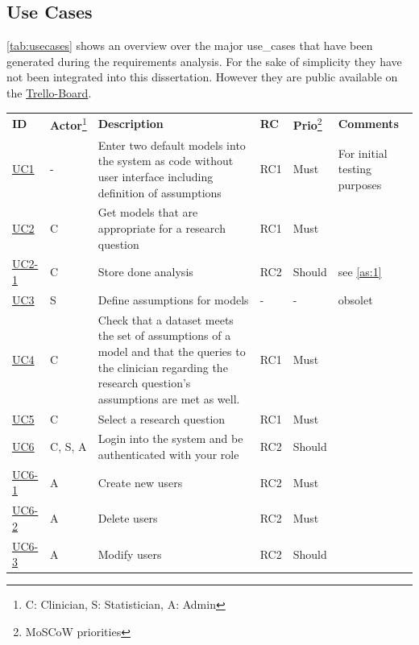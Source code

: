 \subsection{Use Cases}
\label{sub:use_cases}
\autoref{tab:usecases} shows an overview over the major \glspl{use_case} that have been generated during the requirements analysis. For the sake of simplicity they have not been integrated into this dissertation. However they are public available on the \href{https://trello.com/b/ywCkicpc}{Trello-Board}.

\begin{landscape}
	\begin{longtable}{ l l p{10.5cm} l l p{3cm} }
		\textbf{ID}                         & \textbf{\gls{Actor}}\footnote{C: Clinician, S: Statistician, A: Admin} &\textbf{Description} &  \textbf{RC} & \textbf{Prio}\footnote{MoSCoW priorities} &  \textbf{Comments}\\
		\href{https://trello.com/c/KEOokZp9}{UC1}   & 	- & 	Enter two default models into the system as code without user interface including definition of assumptions & RC1 & Must &  For initial testing purposes  \\
		\href{https://trello.com/c/ebVrFdA5}{UC2}   & 	C & 	Get models that are appropriate for a research question & RC1	& Must &	   \\
		\href{https://trello.com/c/ORRBjISQ}{UC2-1} & 	C & 	Store done analysis & RC2 & Should &  see \autoref{as:1} \\
		\href{https://trello.com/c/qKLAoWRj}{UC3} 	&  	S & 	Define assumptions for models & - & - & obsolet \\
		\href{https://trello.com/c/7NINsfz8}{UC4}   & 	C & 	Check that a dataset meets the set of assumptions of a model and that the queries to the clinician regarding the research question's  assumptions are met as well. & RC1 & Must   &   \\
		\href{https://trello.com/c/22JGne3r}{UC5}   & 	C & 	Select a research question & RC1 & Must &   \\
		\href{https://trello.com/c/CVGBVWID}{UC6}   &   C, S, A & 	Login into the system and be authenticated with your role & RC2 & Should &	 \\
		\href{https://trello.com/c/pId27kJM}{UC6-1} &   A & 	Create new users & RC2 & Must &	 \\
		\href{https://trello.com/c/pQ98qgSL}{UC6-2} &  	A & 	Delete users & RC2 & Must	 &   \\
		\href{https://trello.com/c/mvxBeNSR}{UC6-3} &  	A & 	Modify users & RC2 & Should &   \\

\end{longtable}
\end{landscape}
